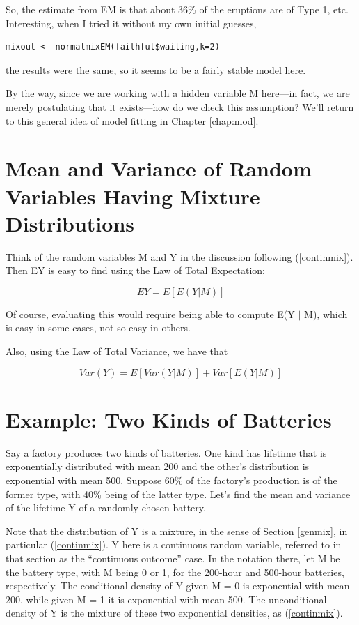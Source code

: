 So, the estimate from EM is that about 36\% of the eruptions are of Type
1, etc.  Interesting, when I tried it without my own initial guesses,

\begin{lstlisting}
mixout <- normalmixEM(faithful$waiting,k=2)
\end{lstlisting}

the results were the same, so it seems to be a fairly stable model here.

By the way, since we are working with a hidden variable M here---in
fact, we are merely postulating that it exists---how do we check this
assumption?  We'll return to this general idea of model fitting in
Chapter \ref{chap:mod}.

\section{Mean and Variance of Random Variables Having Mixture
Distributions}
\label{mixmeanvar}

Think of the random variables M and Y in the discussion following
(\ref{continmix}).  Then EY is easy to find using the Law of Total
Expectation:

\begin{equation}
\label{mixmean}
EY = E[E(Y | M)]
\end{equation}

Of course, evaluating this would require being able to compute E(Y $|$
M), which is easy in some cases, not so easy in others.

Also, using the Law of Total Variance, we have that

\begin{equation}
\label{mixvar}
Var(Y) = E[Var(Y|M)] + Var[E(Y|M)]
\end{equation}

\section{Example:  Two Kinds of Batteries}

Say a factory produces two kinds of batteries.  One kind has lifetime
that is exponentially distributed with mean 200 and the other's
distribution is exponential with mean 500.  Suppose 60\% of the
factory's production is of the former type, with 40\% being of the
latter type.  Let's find the mean and variance of the lifetime Y of a
randomly chosen battery.

Note that the distribution of Y is a mixture, in the sense of Section
\ref{genmix}, in particular (\ref{continmix}).  Y here is a continuous
random variable, referred to in that section as the ``continuous
outcome'' case.   In the notation there, let M be the battery type, with
M being 0 or 1, for the 200-hour and 500-hour batteries, respectively.
The conditional density of Y given M = 0 is exponential with mean 200,
while given M = 1 it is exponential with mean 500.  The unconditional
density of Y is the mixture of these two exponential densities, as 
(\ref{continmix}).

